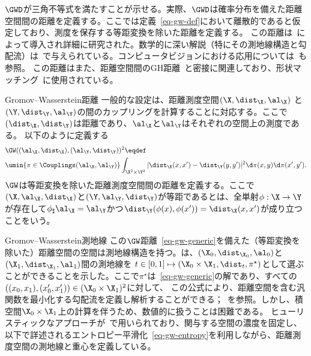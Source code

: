 $\GWD$が三角不等式を満たすことが示せる。実際、$\GWD$は確率分布を備えた距離空間間の距離を定義する。ここでは定義~\eqref{eq-gw-def}において離散的であると仮定しており、測度を保存する等距変換を除いた距離を定義する。
%
この距離は~\citet{memoli-2011}によって導入され詳細に研究された。数学的に深い解説（特にその測地線構造と勾配流）は~\citep{SturmGW}で与えられている。コンピュータビジョンにおける応用については~\citep{schmitzer2013modelling}も参照。
%
この距離はまた、距離空間間のGH距離~\citep{gromov-2001}と密接に関連しており、形状マッチング~\citep{memoli-2007,bronstein-2010}に使用されている。



\begin{rem2}{Gromov--Wasserstein距離}
	一般的な設定は、距離測度空間$(\X,\dist_\X,\al_\X)$
	と$(\Y,\dist_\Y,\al_\Y)$の間のカップリングを計算することに対応する。ここで$(\dist_\X,\dist_\Y)$は距離であり、$\al_\X$と$\al_\Y$はそれぞれの空間上の測度である。
	以下のように定義する
	\begin{equation}
		\label{eq-gw-generic}
		\begin{split}
		&\GW( (\al_\X,\dist_\X), (\al_\Y,\dist_\Y) )^2 \eqdef \\
		&\umin{ \pi \in \Couplings(\al_\X,\al_\Y) }
		\int_{\X^2 \times \Y^2}
		| \dist_\X(x,x')-\dist_\Y(y,y') |^2
		\d\pi(x,y)\d\pi(x',y').
		\end{split}
	\end{equation}
	$\GW$は等距変換を除いた距離測度空間間の距離を定義する。ここで$(\X,\al_\X,\dist_\X)$と$(\Y,\al_\Y,\dist_\Y)$が等距であるとは、全単射$\phi : \X \rightarrow \Y$が存在して$\phi_{\sharp}\al_\X=\al_\Y$かつ$\dist_\Y(\phi(x),\phi(x'))=\dist_\X(x,x')$が成り立つことをいう。
\end{rem2}



\begin{rem2}{Gromov--Wasserstein測地線}\label{rem-geod-gw}
この$\GW$距離~\eqref{eq-gw-generic}を備えた（等距変換を除いた）距離空間の空間は測地線構造を持つ。\citet{SturmGW}は、$(\X_0,\dist_{\X_0},\al_0)$と$(\X_1,\dist_{\X_1},\al_1)$間の測地線を
$t \in [0,1] \mapsto (\X_0 \times \X_1,\dist_t,\pi^\star)$として選ぶことができることを示した。ここで$\pi^\star$は~\eqref{eq-gw-generic}の解であり、すべての$((x_0,x_1), (x_0',x_1')) \in (\X_0 \times \X_1)^2$に対して、
この公式により、距離空間を含む汎関数を最小化する勾配流を定義し解析することができる；~\citet{SturmGW}を参照。しかし、積空間$\X_0 \times \X_1$上の計算を伴うため、数値的に扱うことは困難である。
%
ヒューリスティックなアプローチが~\citep{peyre2016gromov}で用いられており、関与する空間の濃度を固定し、以下で詳述されるエントロピー平滑化~\eqref{eq-gw-entropy}を利用しながら、距離測度空間の測地線と重心を定義している。
\end{rem2}


